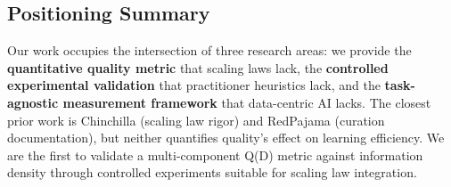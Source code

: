 \subsection{Positioning Summary}

Our work occupies the intersection of three research areas: we provide the \textbf{quantitative quality metric} that scaling laws lack, the \textbf{controlled experimental validation} that practitioner heuristics lack, and the \textbf{task-agnostic measurement framework} that data-centric AI lacks. The closest prior work is Chinchilla (scaling law rigor) and RedPajama (curation documentation), but neither quantifies quality's effect on learning efficiency. We are the first to validate a multi-component Q(D) metric against information density through controlled experiments suitable for scaling law integration.
